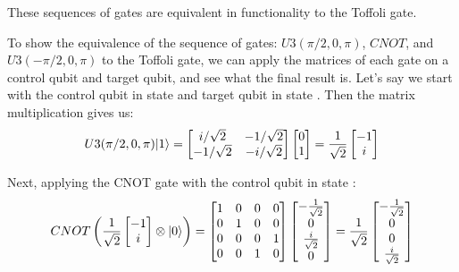 \documentclass{article}
\begin{document}
	These sequences of gates are equivalent in functionality to the Toffoli gate.
	
	To show the equivalence of the sequence of gates: \( U3(\pi/2, 0, \pi) \), \( CNOT \), and \( U3(-\pi/2, 0, \pi) \) to the Toffoli gate, we can apply the matrices of each gate on a control qubit and target qubit, and see what the final result is. 
	Let's say we start with the control qubit in state  and target qubit in state . 
	Then the matrix multiplication gives us:
	\[
	U3(\pi/2, 0, \pi) 
	 |1\rangle  
	= 
	\begin{bmatrix} 
		i/\sqrt{2} 
		& -1/\sqrt{2} 
		\\ 
		-1/\sqrt{2} 
		& -i/\sqrt{2} 
	\end{bmatrix}
	\begin{bmatrix} 
		0 \\ 
		1 
	\end{bmatrix} 
	= 
	\frac{1}{\sqrt{2}} 
	\begin{bmatrix} 
		-1 \\ 
		i 
	\end{bmatrix}
	\]
	
	Next, applying the CNOT gate with the control qubit in state : \\
	\[
	CNOT 
	\left(
	\frac{1}{\sqrt{2}} 
	\begin{bmatrix} 
		-1 \\ 
		i 
	\end{bmatrix} 
	\otimes 
	 |0\rangle 
	\right) 
	= 
	\begin{bmatrix} 
		1 & 0 & 0 & 0 \\ 
		0 & 1 & 0 & 0 \\ 
		0 & 0 & 0 & 1 \\ 
		0 & 0 & 1 & 0 
	\end{bmatrix} 
	\begin{bmatrix} 
		-\frac{1}{\sqrt{2}} \\ 
		0 \\ 
		\frac{i}{\sqrt{2}} \\ 
		0 
	\end{bmatrix} 
	= 
	\frac{1}{\sqrt{2}} 
	\begin{bmatrix} 
		-\frac{1}{\sqrt{2}} \\ 
		0 \\ 
		0 \\ 
		\frac{i}{\sqrt{2}} 
	\end{bmatrix}
	\]
	
\end{document}
